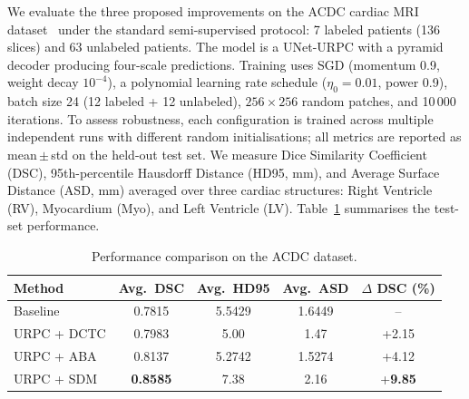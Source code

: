 We evaluate the three proposed improvements on the ACDC cardiac MRI dataset~\cite{media2022urpc} under the standard semi-supervised protocol: 7 labeled patients (136 slices) and 63 unlabeled patients. The model is a UNet-URPC with a pyramid decoder producing four-scale predictions. Training uses SGD (momentum 0.9, weight decay $10^{-4}$), a polynomial learning rate schedule ($\eta_0{=}0.01$, power 0.9), batch size 24 (12 labeled + 12 unlabeled), $256{\times}256$ random patches, and 10\,000 iterations. To assess robustness, each configuration is trained across multiple independent runs with different random initialisations; all metrics are reported as mean\,$\pm$\,std on the held-out test set. We measure Dice Similarity Coefficient (DSC), 95th-percentile Hausdorff Distance (HD95, mm), and Average Surface Distance (ASD, mm) averaged over three cardiac structures: Right Ventricle (RV), Myocardium (Myo), and Left Ventricle (LV). Table~\ref{tab:results} summarises the test-set performance.

\begin{table}[t]
\centering
\caption{Performance comparison on the ACDC dataset.}
\label{tab:results}
\begin{tabular}{lcccc}
\toprule
Method & Avg.\ DSC & Avg.\ HD95 & Avg.\ ASD & $\Delta$ DSC (\%) \\
\midrule
Baseline           & 0.7815 & 5.5429 & 1.6449 & --              \\
URPC + DCTC        & 0.7983 & 5.00   & 1.47   & +2.15           \\
URPC + ABA         & 0.8137 & 5.2742 & 1.5274 & +4.12           \\
URPC + SDM         & \textbf{0.8585} & 7.38 & 2.16 & +\textbf{9.85} \\
\bottomrule
\end{tabular}
\end{table}

